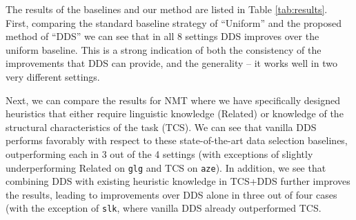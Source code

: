 
The results of the baselines and our method are listed in Table \ref{tab:results}.
First, comparing the standard baseline strategy of ``Uniform'' and the proposed method of ``DDS'' we can see that in all 8 settings DDS improves over the uniform baseline.
This is a strong indication of both the consistency of the improvements that DDS can provide, and the generality -- it works well in two very different settings.

Next, we can compare the results for NMT where we have specifically designed heuristics that either require linguistic knowledge (Related) or knowledge of the structural characteristics of the task (TCS).
We can see that vanilla DDS performs favorably with respect to these state-of-the-art data selection baselines, outperforming each in 3 out of the 4 settings (with exceptions of slightly underperforming Related on \texttt{glg} and TCS on \texttt{aze}).
In addition, we see that combining DDS with existing heuristic knowledge in TCS+DDS further improves the results, leading to improvements over DDS alone in three out of four cases (with the exception of \texttt{slk}, where vanilla DDS already outperformed TCS.
